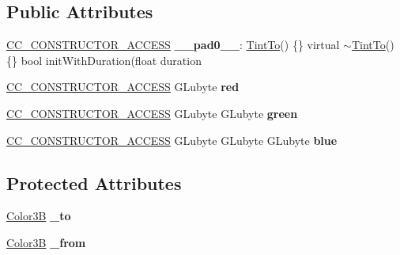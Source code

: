 \subsection*{Public Attributes}
\begin{DoxyCompactItemize}
\item 
\mbox{\label{classTintTo_a3f3cf951b59b167d10278a64e899541c}} 
\hyperlink{_2cocos2d_2cocos_2base_2ccConfig_8h_a25ef1314f97c35a2ed3d029b0ead6da0}{C\+C\+\_\+\+C\+O\+N\+S\+T\+R\+U\+C\+T\+O\+R\+\_\+\+A\+C\+C\+E\+SS} {\bfseries \+\_\+\+\_\+pad0\+\_\+\+\_\+}\+: \hyperlink{classTintTo}{Tint\+To}() \{\} virtual $\sim$\hyperlink{classTintTo}{Tint\+To}() \{\} bool init\+With\+Duration(float duration
\item 
\mbox{\label{classTintTo_aa9a2976b6573591ee415e04ed506d876}} 
\hyperlink{_2cocos2d_2cocos_2base_2ccConfig_8h_a25ef1314f97c35a2ed3d029b0ead6da0}{C\+C\+\_\+\+C\+O\+N\+S\+T\+R\+U\+C\+T\+O\+R\+\_\+\+A\+C\+C\+E\+SS} G\+Lubyte {\bfseries red}
\item 
\mbox{\label{classTintTo_a081458159d81757f243df2a00cd05480}} 
\hyperlink{_2cocos2d_2cocos_2base_2ccConfig_8h_a25ef1314f97c35a2ed3d029b0ead6da0}{C\+C\+\_\+\+C\+O\+N\+S\+T\+R\+U\+C\+T\+O\+R\+\_\+\+A\+C\+C\+E\+SS} G\+Lubyte G\+Lubyte {\bfseries green}
\item 
\mbox{\label{classTintTo_a0d8f3cbbf95ea271d8e5152577c6e2da}} 
\hyperlink{_2cocos2d_2cocos_2base_2ccConfig_8h_a25ef1314f97c35a2ed3d029b0ead6da0}{C\+C\+\_\+\+C\+O\+N\+S\+T\+R\+U\+C\+T\+O\+R\+\_\+\+A\+C\+C\+E\+SS} G\+Lubyte G\+Lubyte G\+Lubyte {\bfseries blue}
\end{DoxyCompactItemize}
\subsection*{Protected Attributes}
\begin{DoxyCompactItemize}
\item 
\mbox{\label{classTintTo_aea5fa7917e459360bdea0f0f6eefda8d}} 
\hyperlink{structColor3B}{Color3B} {\bfseries \+\_\+to}
\item 
\mbox{\label{classTintTo_ac93709a2552444280ff8271f8acc7822}} 
\hyperlink{structColor3B}{Color3B} {\bfseries \+\_\+from}
\end{DoxyCompactItemize}
